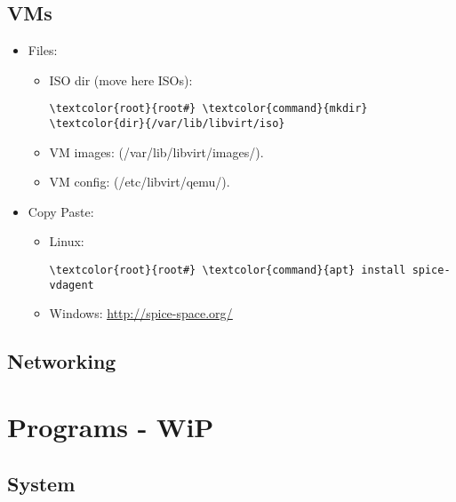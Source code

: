 \documentclass[10pt, a4paper, onecolumn, openany]{book} %
\begin{document}
\section{VMs}
\begin{itemize}
    \item Files:
    \begin{itemize}
        \item ISO dir (move here ISOs):
        \begin{Verbatim}[commandchars=\\\{\}]
\textcolor{root}{root#} \textcolor{command}{mkdir} \textcolor{dir}{/var/lib/libvirt/iso}
        \end{Verbatim}
        \item VM images: (\textcolor{dir}{/var/lib/libvirt/images/}).
        \item VM config: (\textcolor{dir}{/etc/libvirt/qemu/}).
    \end{itemize}
    \item Copy Paste:
        \begin{itemize}
            \item Linux:
            \begin{Verbatim}[commandchars=\\\{\}]
\textcolor{root}{root#} \textcolor{command}{apt} install spice-vdagent
        \end{Verbatim}
            \item Windows:
            \newline \underline{\url{http://spice-space.org/}}
        \end{itemize}
\end{itemize}
\section{Networking}
\chapter{Programs - WiP}
\section{System}
\end{document}
